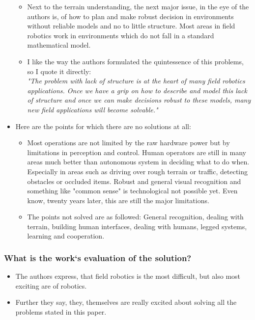 \begin{itemize}
\begin{itemize}
            \item Next to the terrain understanding, the next major issue, in the eye of the authors is, of how to plan and make robust decision in environments without reliable models and no to little structure. Most areas in field robotics work in environments which do not fall in a standard mathematical model.
            \item I like the way the authors formulated the quintessence of this problems, so I quote it directly: \\
             \emph{"The problem with lack of structure is at the heart of many field robotics applications. Once we have a grip on how to describe and model this lack of structure and once we can make decisions robust to these models, many new field applications will become solvable."}
        \end{itemize}
        \item Here are the points for which there are no solutions at all: \ \begin{itemize}
            \item Most operations are not limited by the raw hardware power but by limitations in perception and control. Human operators are still in many areas much better than autonomous system in deciding what to do when. Especially in areas such as driving over rough terrain or traffic, detecting obstacles or occluded items. Robust and general visual recognition and something like "common sense" is technological not possible yet. Even know, twenty years later, this are still the major limitations.
            \item The points not solved are as followed: General recognition, dealing with terrain, building human interfaces, dealing with humans, legged systems, learning and cooperation.
        \end{itemize}
    \end{itemize}
    \subsubsection*{What is the work`s evaluation of the solution?}
    \begin{itemize}
        \item The authors express, that field robotics is the most difficult, but also most exciting are of robotics. 
        \item Further they say, they, themselves are really excited about solving all the problems stated in this paper.
    \end{itemize}

